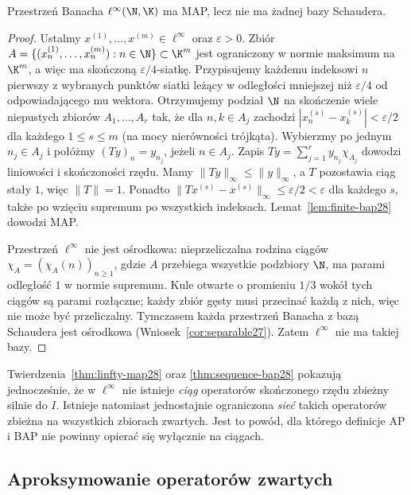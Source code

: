 \begin{twierdzenie}
\label{thm:linfty-map28}
Przestrzeń Banacha $\ell^\infty(\N,\K)$ ma MAP,
lecz nie ma żadnej bazy Schaudera.
\end{twierdzenie}
\begin{proof}
Ustalmy $x^{(1)},\ldots,x^{(m)}\in\ell^\infty$ oraz
$\varepsilon>0$. Zbiór
$A=\{(x^{(1)}_n,\ldots,x^{(m)}_n):n\in\N\}\subset\K^m$
jest ograniczony w normie maksimum na $\K^m$, a więc
ma skończoną $\varepsilon/4$-siatkę. Przypisujemy każdemu indeksowi
$n$ pierwszy z wybranych punktów siatki leżący w odległości
mniejszej niż $\varepsilon/4$
od odpowiadającego mu wektora. Otrzymujemy podział $\N$
na skończenie wiele niepustych zbiorów $A_1,\ldots,A_r$ tak,
że dla $n,k\in A_j$ zachodzi
$|x_n^{(s)}-x_k^{(s)}|<\varepsilon/2$
dla każdego $1\le s\le m$ (na mocy nierówności trójkąta).
Wybierzmy po jednym $n_j\in A_j$ i połóżmy
$(Ty)_n=y_{n_j}$, jeżeli $n\in A_j$.
Zapis $Ty=\sum_{j=1}^r y_{n_j}\chi_{A_j}$ dowodzi liniowości
i skończoności rzędu. Mamy $\|Ty\|_\infty\le\|y\|_\infty$,
a $T$ pozostawia ciąg stały $1$, więc $\|T\|=1$.
Ponadto $\|Tx^{(s)}-x^{(s)}\|_\infty\le\varepsilon/2<\varepsilon$
dla każdego $s$, także po wzięciu supremum po wszystkich indeksach.
Lemat~\ref{lem:finite-bap28} dowodzi MAP.

Przestrzeń $\ell^\infty$ nie jest ośrodkowa:
nieprzeliczalna rodzina ciągów $\chi_A=(\chi_A(n))_{n\ge1}$,
gdzie $A$ przebiega wszystkie podzbiory $\N$,
ma parami odległość $1$ w normie supremum.
Kule otwarte o promieniu $1/3$ wokół tych ciągów są parami
rozłączne; każdy zbiór gęsty musi przecinać każdą z nich,
więc nie może być przeliczalny.
Tymczasem każda przestrzeń Banacha z bazą Schaudera
jest ośrodkowa (Wniosek~\ref{cor:separable27}). Zatem $\ell^\infty$ nie ma takiej bazy.
\end{proof}

\begin{uwaga}
\label{rem:linfty-sequence28}
Twierdzenia~\ref{thm:linfty-map28} oraz
\ref{thm:sequence-bap28} pokazują jednocześnie, że
w $\ell^\infty$ nie istnieje \emph{ciąg} operatorów
skończonego rzędu zbieżny silnie do $I$.
Istnieje natomiast jednostajnie ograniczona \emph{sieć}
takich operatorów zbieżna na wszystkich zbiorach zwartych.
Jest to powód, dla którego definicje AP i BAP nie powinny
opierać się wyłącznie na ciągach.
\end{uwaga}

\subsection{Aproksymowanie operatorów zwartych}

